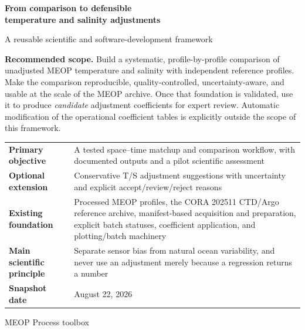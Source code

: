 \documentclass[11pt,a4paper]{article}
\newcommand{\goodbox}[1]{%
  \noindent\colorbox{meoplight}{\parbox{0.955\textwidth}{\vspace{0.2cm}#1\vspace{0.2cm}}}}
\begin{document}
\begin{titlepage}
  \centering
  \vspace*{1.4cm}
  {\Huge\bfseries\color{meopblue}From comparison to defensible\\[0.2em]
  temperature and salinity adjustments\par}
  \vspace{0.7cm}
  {\Large A reusable scientific and software-development framework\par}
  \vspace{1.1cm}

  \goodbox{
    \textbf{Recommended scope.} Build a systematic, profile-by-profile comparison of
    unadjusted MEOP temperature and salinity with independent reference profiles.
    Make the comparison reproducible, quality-controlled, uncertainty-aware, and
    usable at the scale of the MEOP archive. Once that foundation is validated,
    use it to produce \emph{candidate} adjustment coefficients for expert review.
    Automatic modification of the operational coefficient tables is explicitly
    outside the scope of this framework.
  }

  \vspace{1.1cm}
  \begin{tabularx}{0.94\textwidth}{>{\bfseries}p{}X}
    Primary objective & A tested space--time matchup and comparison workflow, with documented outputs and a pilot scientific assessment \\
    Optional extension & Conservative T/S adjustment suggestions with uncertainty and explicit accept/review/reject reasons \\
    Existing foundation & Processed MEOP profiles, the CORA 202511 CTD/Argo reference archive, manifest-based acquisition and preparation, explicit batch statuses, coefficient application, and plotting/batch machinery \\
    Main scientific principle & Separate sensor bias from natural ocean variability, and never use an adjustment merely because a regression returns a number \\
    Snapshot date & August 22, 2026 \\
  \end{tabularx}

  \vfill
  {\large MEOP Process toolbox\par}
\end{titlepage}

\tableofcontents
\clearpage
{}
\end{document}
